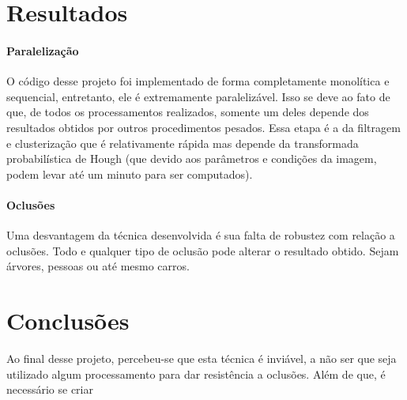 \documentclass[10pt,twocolumn,letterpaper]{article}
\begin{document}
\section{Resultados}

\paragraph{Paralelização}
	O código desse projeto foi implementado de forma completamente monolítica e sequencial,
entretanto, ele é extremamente paralelizável. Isso se deve ao fato de que, de todos os processamentos
realizados, somente um deles depende dos resultados obtidos por outros procedimentos pesados.
Essa etapa é a da filtragem e clusterização que é relativamente rápida mas depende da transformada
probabilística de Hough (que devido aos parâmetros e condições da imagem, podem levar até um minuto
para ser computados).

\paragraph{Oclusões}
	Uma desvantagem da técnica desenvolvida é sua falta de robustez com relação a oclusões.
Todo e qualquer tipo de oclusão pode alterar o resultado obtido. Sejam árvores, pessoas ou até
mesmo carros. 


\section{Conclusões}
	Ao final desse projeto, percebeu-se que esta técnica é inviável, a não ser que seja utilizado
algum processamento para dar resistência a oclusões. Além de que, é necessário se criar 









{\small


}
\end{document}

